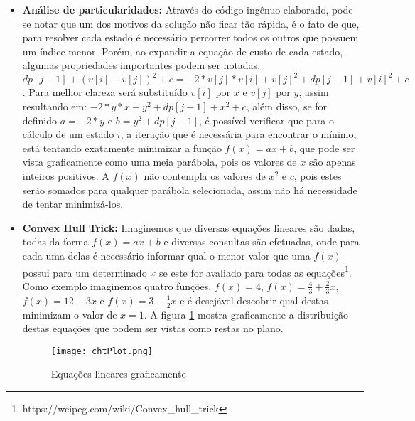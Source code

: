 \begin{itemize}
\item \textbf{Análise de particularidades:}
Através do código ingênuo elaborado, pode-se notar que um dos motivos da solução não ficar tão rápida, é o fato de que, para resolver cada estado é necessário percorrer todos os outros que possuem um índice menor. Porém, ao expandir a equação de custo de cada estado, algumas propriedades importantes podem ser notadas.
$dp[j-1] + (v[i] - v[j])^2 + c = -2*v[j]*v[i] + v[j]^2 + dp[j-1] + v[i]^2 + c$. Para melhor clareza será substituído $v[i]$ por $x$ e $v[j]$ por $y$, assim resultando em:
$-2*y*x + y^2 + dp[j-1] + x^2 + c$, além disso, se for definido $a = -2*y$ e $b = y^2 + dp[j-1]$, é possível verificar que para o cálculo de um estado $i$, a iteração que é necessária para encontrar o mínimo, está tentando exatamente minimizar a função $f(x) = ax + b$, que pode ser vista graficamente como uma meia parábola, pois os valores de $x$ são apenas inteiros positivos. A $f(x)$ não contempla os valores de $x^2$ e $c$, pois estes serão somados para qualquer parábola selecionada, assim não há necessidade de tentar minimizá-los.

\item \textbf{Convex Hull Trick:}
Imaginemos que diversas equações lineares são dadas, todas da forma $f(x) = ax + b$ e diversas consultas são efetuadas, onde para cada uma delas é necessário informar qual o menor valor que uma $f(x)$ possui para um determinado $x$ se este for avaliado para todas as equações\footnote{https://wcipeg.com/wiki/Convex\_hull\_trick}. 
Como exemplo imaginemos quatro funções, $f(x) = 4$, $f(x) = \frac{4}{3} + \frac{2}{3}x$, $f(x) = 12 - 3x$ e $f(x) = 3 - \frac{1}{2}x$ e é desejável descobrir qual destas minimizam o valor de $x = 1$. A figura \ref{fig:chtplot} mostra graficamente a distribuição destas equações que podem ser vistas como restas no plano.

\begin{figure}[H]
	\centering
	\caption[Equações lineares graficamente]{Equações lineares graficamente}
	\texttt{[image: chtPlot.png]} %
	\label{fig:chtplot}
\end{figure}


\end{itemize}
